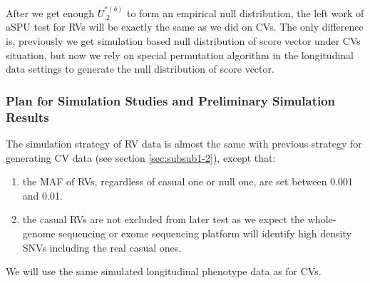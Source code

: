 \documentclass[12pt]{article}
\begin{document}
After we get enough $U_{.2}^{ *(b) }$ to form an empirical null distribution, the left work of aSPU test for RVs will be exactly the same as we did on CVs. The only difference is, previously we get simulation based null distribution of score vector under CVs situation, but now we rely on special permutation algorithm in the longitudinal data settings to generate the null distribution of score vector.

\subsubsection{Plan for Simulation Studies and Preliminary Simulation Results}\label{sec:subsub2-2}
The simulation strategy of RV data is almost the same with previous strategy for generating CV data (see section \ref{sec:subsub1-2}), except that:
\begin{enumerate}
\item the MAF of RVs, regardless of casual one or null one, are set between 0.001 and 0.01.
\item the casual RVs are not excluded from later test as we expect the whole-genome sequencing or exome sequencing platform will identify high density SNVs including the real casual ones.
\end{enumerate}
We will use the same simulated longitudinal phenotype data as for CVs.\\\\
\end{document}
